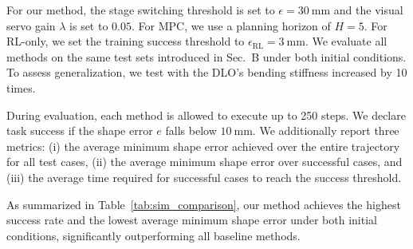 \documentclass[letterpaper, 10 pt, conference]{ieeeconf}  %
\begin{document}
For our method, the stage switching threshold is set to $\epsilon=30~\mathrm{mm}$ and the visual servo gain $\lambda$ is set to $0.05$. For MPC, we use a planning horizon of $H=5$. For RL-only, we set the training success threshold to $\epsilon_{\mathrm{RL}}=3~\mathrm{mm}$. We evaluate all methods on the same test sets introduced in Sec.~B under both initial conditions. To assess generalization, we test with the DLO's bending stiffness increased by 10 times.

During evaluation, each method is allowed to execute up to 250 steps. We declare task success if the shape error $e$ falls below $10~\mathrm{mm}$. We additionally report three metrics: (i) the average minimum shape error achieved over the entire trajectory for all test cases, (ii) the average minimum shape error over successful cases, and (iii) the average time required for successful cases to reach the success threshold.



As summarized in Table~\ref{tab:sim_comparison}, our method achieves the highest success rate and the lowest average minimum shape error under both initial conditions, significantly outperforming all baseline methods.
\end{document}
